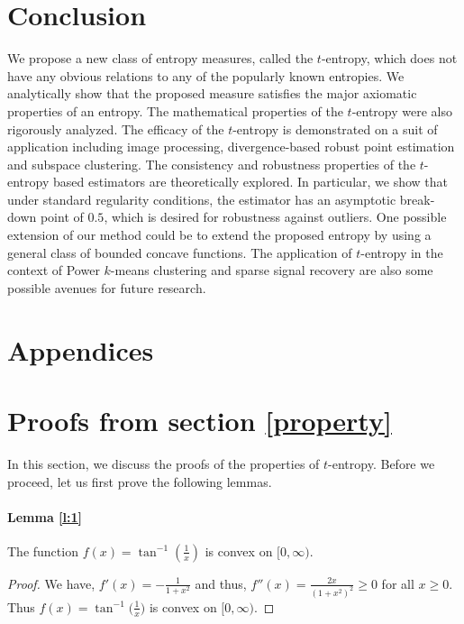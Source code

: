 \documentclass{article}
\begin{document}
\section{Conclusion}\label{discussion}
We propose a new class of entropy measures, called the $t$-entropy, which does not have any obvious relations to any of the popularly known entropies. We analytically show that the proposed measure satisfies the major axiomatic properties of an entropy. The mathematical properties of the $t$-entropy were also rigorously analyzed. The efficacy of the $t$-entropy is demonstrated on a suit of application including image processing, divergence-based robust point estimation and subspace clustering. The consistency and robustness properties of the $t$-entropy based estimators are theoretically explored. In particular, we show that under standard regularity conditions, the estimator has an asymptotic break-down point of $0.5$, which is desired for robustness against outliers.  One possible extension of our method could be to extend the proposed entropy by using a general class of bounded concave functions. %
The application of $t$-entropy in the context of Power $k$-means clustering %
and sparse signal recovery %
are also some possible avenues for future research.
 




\appendix
\section*{Appendices}
\section{Proofs from section \ref{property}}\label{a1}
In this section, we discuss the proofs of the properties of $t$-entropy. Before we proceed, let us first prove the following lemmas.
\label{S3}
\paragraph{Lemma \ref{l:1}}
The function $f(x)=\tan^{-1}\left(\frac{1}{x}\right)$ is convex on $[0,\infty)$.
\begin{proof}
We have, $f'(x) = - \frac{1}{1+x^2}$ and thus, $f''(x) =  \frac{2x}{(1+x^2)^2} \geq 0$ for all $x \geq 0$. Thus $f(x)=\tan^{-1}\bigg(\frac{1}{x}\bigg)$ is convex on $[0,\infty)$.
\end{proof}
\end{document}
